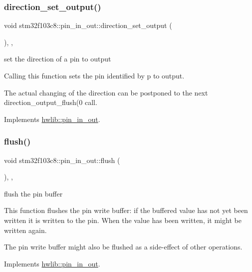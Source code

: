 \subsubsection{\texorpdfstring{direction\+\_\+set\+\_\+output()}{direction\_set\_output()}}
{\footnotesize\ttfamily void stm32f103c8\+::pin\+\_\+in\+\_\+out\+::direction\+\_\+set\+\_\+output (\begin{DoxyParamCaption}{ }\end{DoxyParamCaption})\hspace{0.3cm}{\ttfamily [inline]}, {\ttfamily [override]}, {\ttfamily [virtual]}}

set the direction of a pin to output

Calling this function sets the pin identified by p to output.

The actual changing of the direction can be postponed to the next direction\+\_\+output\+\_\+flush(0 call. 

Implements \hyperlink{classhwlib_1_1pin__in__out_ad08a5f5e9a4c3aadaa7c665b98f2418e}{hwlib\+::pin\+\_\+in\+\_\+out}.

\mbox{\label{classstm32f103c8_1_1pin__in__out_aae0b516a0f186e8f6be498af8b1ca238}} 
\subsubsection{\texorpdfstring{flush()}{flush()}}
{\footnotesize\ttfamily void stm32f103c8\+::pin\+\_\+in\+\_\+out\+::flush (\begin{DoxyParamCaption}{ }\end{DoxyParamCaption})\hspace{0.3cm}{\ttfamily [inline]}, {\ttfamily [override]}, {\ttfamily [virtual]}}

flush the pin buffer

This function flushes the pin write buffer\+: if the buffered value has not yet been written it is written to the pin. When the value has been written, it might be written again.

The pin write buffer might also be flushed as a side-\/effect of other operations. 

Implements \hyperlink{classhwlib_1_1pin__in__out_a5207c9e30f0c88e4c052952397c2da88}{hwlib\+::pin\+\_\+in\+\_\+out}.

